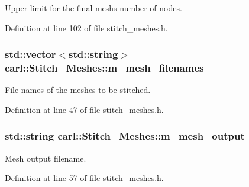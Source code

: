 Upper limit for the final mesh\textquotesingle{}s number of nodes. 



Definition at line 102 of file stitch\+\_\+meshes.\+h.

\hypertarget{classcarl_1_1_stitch___meshes_afc9fe061a29560f4807ed560409eb374}{}
\subsubsection[{m\+\_\+mesh\+\_\+filenames}]{\setlength{\rightskip}{0pt plus 5cm}std\+::vector$<$std\+::string$>$ carl\+::\+Stitch\+\_\+\+Meshes\+::m\+\_\+mesh\+\_\+filenames\hspace{0.3cm}{\ttfamily [protected]}}\label{classcarl_1_1_stitch___meshes_afc9fe061a29560f4807ed560409eb374}


File names of the meshes to be stitched. 



Definition at line 47 of file stitch\+\_\+meshes.\+h.

\hypertarget{classcarl_1_1_stitch___meshes_ad3f001d09c6d65ab836b2f0e96d9ee64}{}
\subsubsection[{m\+\_\+mesh\+\_\+output}]{\setlength{\rightskip}{0pt plus 5cm}std\+::string carl\+::\+Stitch\+\_\+\+Meshes\+::m\+\_\+mesh\+\_\+output\hspace{0.3cm}{\ttfamily [protected]}}\label{classcarl_1_1_stitch___meshes_ad3f001d09c6d65ab836b2f0e96d9ee64}


Mesh output filename. 



Definition at line 57 of file stitch\+\_\+meshes.\+h.

\hypertarget{classcarl_1_1_stitch___meshes_a01c131c2e0c83ef1642326f6ea4f97d2}{}
